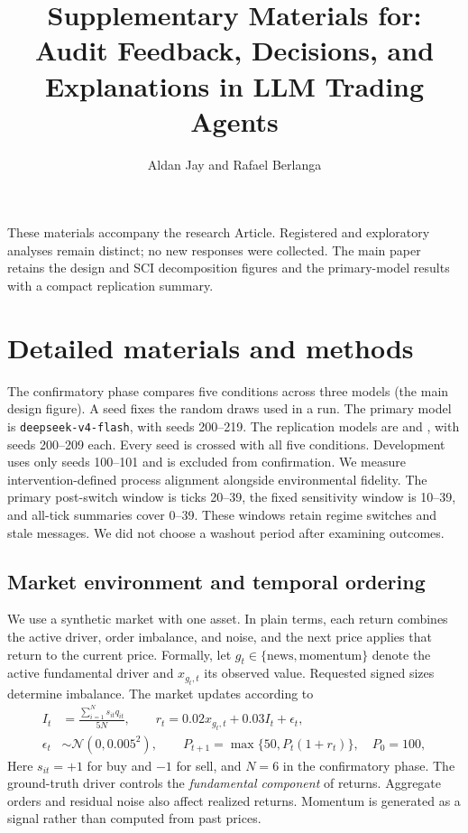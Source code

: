 \documentclass[a4paper]{article}
\title{Supplementary Materials for: Audit Feedback, Decisions, and Explanations in LLM Trading Agents}
\author{Aldan Jay and Rafael Berlanga}
\begin{document}
\maketitle
These materials accompany the research Article. Registered and exploratory analyses remain distinct; no new responses were collected. The main paper retains the design and SCI decomposition figures and the primary-model results with a compact replication summary.

\section{Detailed materials and methods}\label{supp:methods}
The confirmatory phase compares five conditions across three models (the main design figure). A seed fixes the random draws used in a run. The primary model is \texttt{deepseek-v4-flash}, with seeds 200--219. The replication models are  and , with seeds 200--209 each. Every seed is crossed with all five conditions. Development uses only seeds 100--101 and is excluded from confirmation. We measure intervention-defined process alignment alongside environmental fidelity. The primary post-switch window is ticks 20--39, the fixed sensitivity window is 10--39, and all-tick summaries cover 0--39. These windows retain regime switches and stale messages. We did not choose a washout period after examining outcomes.


\subsection{Market environment and temporal ordering}
We use a synthetic market with one asset. In plain terms, each return combines the active driver, order imbalance, and noise, and the next price applies that return to the current price. Formally, let $g_t\in\{\mathrm{news},\mathrm{momentum}\}$ denote the active fundamental driver and $x_{g_t,t}$ its observed value. Requested signed sizes determine imbalance. The market updates according to
\begin{equation}
\begin{aligned}
 I_t&=\frac{\sum_{i=1}^{N}s_{it}q_{it}}{5N},\qquad
 r_t=0.02x_{g_t,t}+0.03I_t+\epsilon_t,\\
 \epsilon_t&\sim\mathcal{N}(0,0.005^2),\qquad
 P_{t+1}=\max\{50,P_t(1+r_t)\},\quad P_0=100,
\end{aligned}
 \label{eq:market}
\end{equation}
Here $s_{it}=+1$ for buy and $-1$ for sell, and $N=6$ in the confirmatory phase. The ground-truth driver controls the \emph{fundamental component} of returns. Aggregate orders and residual noise also affect realized returns. Momentum is generated as a signal rather than computed from past prices.
\end{document}
